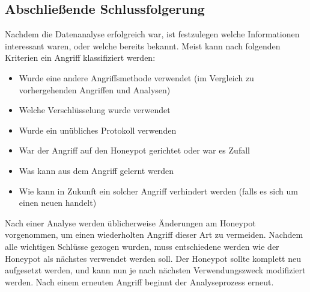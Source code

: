 \subsection{Abschließende Schlussfolgerung}
Nachdem die Datenanalyse erfolgreich war, ist festzulegen welche Informationen interessant waren, oder welche bereits bekannt. Meist kann nach folgenden Kriterien ein Angriff klassifiziert werden:

\begin{itemize}
\item Wurde eine andere Angriffsmethode verwendet (im Vergleich zu vorhergehenden Angriffen und Analysen)
\item Welche Verschlüsselung wurde verwendet
\item Wurde ein unübliches Protokoll verwenden
\item War der Angriff auf den Honeypot gerichtet oder war es Zufall
\item Was kann aus dem Angriff gelernt werden
\item Wie kann in Zukunft ein solcher Angriff verhindert werden (falls es sich um einen neuen handelt)
\end{itemize}

\noindent Nach einer Analyse werden üblicherweise Änderungen am Honeypot vorgenommen, um einen wiederholten Angriff dieser Art zu vermeiden. Nachdem alle wichtigen Schlüsse gezogen wurden, muss entschiedene werden wie der Honeypot als nächstes verwendet werden soll. Der Honeypot sollte komplett neu aufgesetzt werden, und kann nun je nach nächsten Verwendungszweck modifiziert werden. Nach einem erneuten Angriff beginnt der Analyseprozess erneut.
